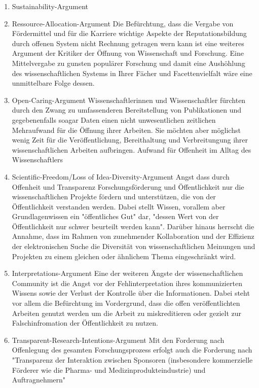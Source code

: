 \begin{enumerate}
\item Sustainability-Argument
\item Ressource-Allocation-Argument
Die Befürchtung, dass die Vergabe von Fördermittel und für die Karriere wichtige Aspekte der Reputationsbildung durch offenen System nicht Rechnung getragen wern kann ist eine weiteres Argument der Kritiker der Öffnung von Wissenschaft und Forschung. Eine Mittelvergabe zu gunsten populärer Forschung und damit eine Aushöhlung des wissenschaftlichen Systems in Ihrer Fächer und Facettenvielfalt wäre eine unmittelbare Folge dessen.
\item Open-Caring-Argument
Wissenschaftlerinnen und Wissenschaftler fürchten durch den Zwang zu umfassenderen Bereitstellung von Publikationen und gegebenenfalls soagar Daten einen nicht unwesentlichen zeitlichen Mehraufwand für die Öffnung ihrer Arbeiten. Sie möchten aber möglichst wenig Zeit für die Veröffentlichung, Bereithaltung und Verbreitungung ihrer wissenschaftlichen Arbeiten aufbringen.
	Aufwand für Offenheit im Alltag des Wissenschaftlers
\item Scientific-Freedom/Loss of Idea-Diversity-Argument
Angst dass durch Offenheit und Transparenz Forschungsförderung und Öffentlichkeit nur die wissenschaftlichen Projekte fördern und unterstützen, die von der Öffentlichkeit verstanden werden. Dabei stellt Wissen, vorallem aber Grundlagenwissen ein "öffentliches Gut" dar, "dessen Wert von der Öffentlichkeit nur schwer beurteilt werden kann"\cite{osterloh2008anreize}. Darüber hinaus herrscht die Annahme, dass im Rahmen von zunehmender Kollaboration und der Effizienz der elektronischen Suche die Diversität von wissenschaftlichen Meinungen und Projekten zu einem gleichen oder ähnlichem Thema eingeschränkt wird\cite{Evans_2008}.
\item Interpretations-Argument
Eine der weiteren Ängste der wissenschaftlichen Community ist die Angst vor der Fehlinterpretation ihres kommunizierten Wissens sowie der Verlust der Kontrolle über die Informationen\cite{gibbons_1994}. Dabei steht vor allem die Befürchtung im Vordergrund, dass die offen veröffentlichten Arbeiten genutzt werden um die Arbeit zu miskreditieren oder gezielt zur Falschinfromation der Öffentlichkeit zu nutzen.
\item Transparent-Research-Intentions-Argument
Mit den Forderung nach Offenlegung des gesamten Forschungsprozess erfolgt auch die Forderung nach "Transparenz der Interaktion zwischen Sponsoren (insbesondere kommerzielle Förderer wie die Pharma- und Medizinprodukteindustrie) und Auftragnehmern" \cite{Stengel_2013} 
\end{enumerate}

